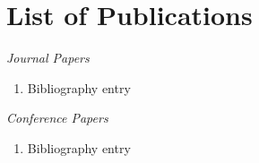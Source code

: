 \chapter*{List of Publications}

\textit{Journal Papers}

\begin{enumerate}
	

\item Bibliography entry



\end{enumerate}

\vspace{10pt}
\textit{Conference Papers}

\begin{enumerate}

\item Bibliography entry
\end{enumerate}







